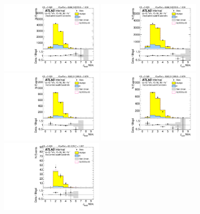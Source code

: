 \begin{figure}[htbp!]
\begin{center}
\includegraphics[width=0.45\textwidth,angle=-90]{figures/boosted/Control/b77_TwoTag_split_Control_leadHCand_ntrk.pdf}
\includegraphics[width=0.45\textwidth,angle=-90]{figures/boosted/Control/b77_TwoTag_split_Control_sublHCand_ntrk.pdf}\\
\includegraphics[width=0.45\textwidth,angle=-90]{figures/boosted/Control/b77_ThreeTag_Control_leadHCand_ntrk.pdf}
\includegraphics[width=0.45\textwidth,angle=-90]{figures/boosted/Control/b77_ThreeTag_Control_sublHCand_ntrk.pdf}\\
\includegraphics[width=0.45\textwidth,angle=-90]{figures/boosted/Control/b77_FourTag_Control_leadHCand_ntrk.pdf}

\end{center}
\end{figure}
